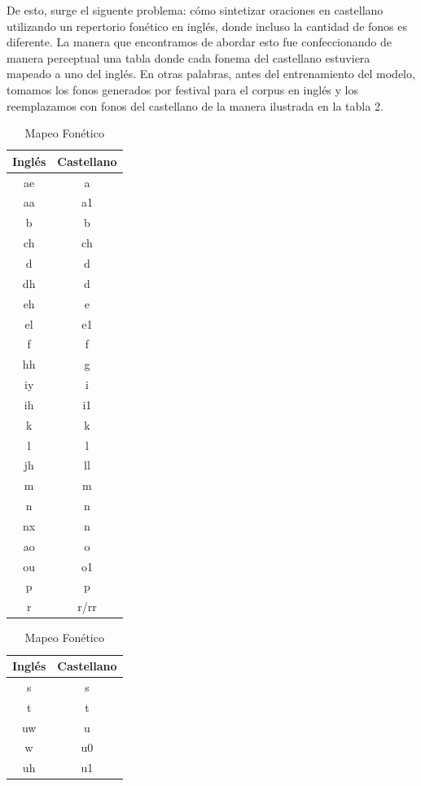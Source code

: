 De esto, surge el siguente problema: cómo sintetizar oraciones en castellano utilizando un repertorio fonético en inglés, donde incluso la cantidad de fonos es diferente. La manera que encontramos de abordar esto fue confeccionando de manera perceptual una tabla donde cada fonema del castellano estuviera mapeado a uno del inglés. En otras palabras, antes del entrenamiento del modelo, tomamos los fonos generados por festival para el corpus en inglés y los reemplazamos con fonos del castellano de la manera ilustrada en la tabla 2.
\begin{table}
\centering
\caption{Mapeo Fonético}
\begin{minipage}[t]{0.3\textwidth}
\begin{tabular}[t]{c|c}
\toprule
Inglés & Castellano \\
\midrule
ae & a\\  
aa & a1\\  
b & b\\  
ch & ch\\  
d & d\\  
dh & d\\  
eh & e\\  
el & e1\\  
f & f\\  
hh & g \\  
iy & i\\  
ih & i1\\  
k & k\\  
l & l\\  
jh & ll\\  
m & m\\  
n & n\\  
nx & n\\  
ao & o\\  
ou & o1\\  
p & p\\  
r & r/rr\\  
\bottomrule
\end{tabular}
\end{minipage}
\begin{minipage}[t]{0.3\textwidth}
\begin{tabular}[t]{c|c}
\toprule
Inglés & Castellano \\ 
\midrule
s & s\\  
t & t\\  
uw & u\\  
w & u0\\  
uh & u1\\  

\end{tabular}
\end{minipage}
\end{table}
